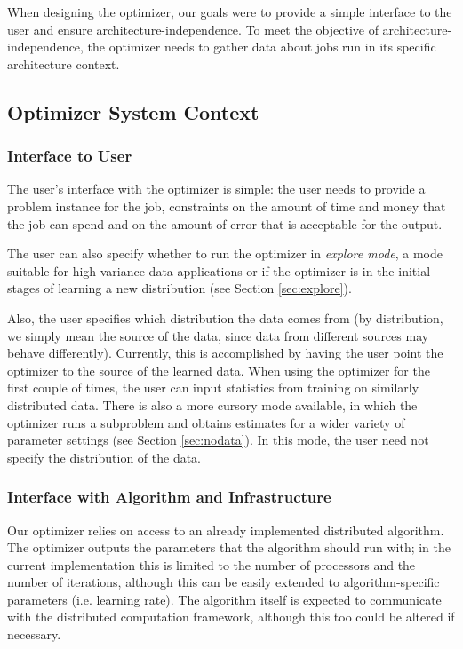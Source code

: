 
When designing the optimizer, our goals were to provide a simple 
interface to the user and ensure architecture-independence. To meet
the objective of architecture-independence, the optimizer needs to gather
data about jobs run in its specific architecture context.  

\subsection{Optimizer System Context}


\subsubsection{Interface to User}
The user's interface with the optimizer is simple: the user needs to
provide a problem instance for the job, constraints on the amount of
time and money that the job can spend and on the amount of error
that is acceptable for the output. 

The user can also specify whether to run the optimizer in {\em explore 
mode}, a mode suitable for high-variance data applications or if the 
optimizer is in the initial stages of learning a new 
distribution (see Section \ref{sec:explore}). 

Also, the user specifies which distribution the data comes from (by
distribution, we simply mean the source of the data, since data from
different sources may behave differently). Currently,
this is accomplished by having the user point the optimizer to the 
source of the learned data. When using the optimizer for the first 
couple of times, the user can input statistics from training on similarly
distributed data. There is also a more cursory mode available, in which
the optimizer runs a subproblem and obtains estimates for a wider 
variety of parameter settings (see Section \ref{sec:nodata}). In this 
mode, the user need not specify the distribution of the data. 

\subsubsection{Interface with Algorithm and Infrastructure}
Our optimizer relies on access to an already implemented distributed 
algorithm. The optimizer outputs the parameters that the algorithm 
should run with; in the current implementation this is limited to 
the number of processors and the number of iterations, although this
can be easily extended to algorithm-specific parameters (i.e. learning
rate). 
The algorithm itself is expected to communicate with the distributed
computation framework, although this too could be altered if necessary.

